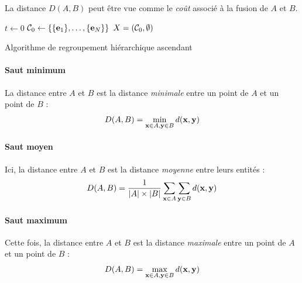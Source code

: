 La distance $D(A, B)$ peut être vue comme le \textit{coût} associé à la fusion de $A$ et $B$. 

\begin{algorithm}
$t \leftarrow  0$ \;
$\cal{C}_0 \leftarrow  \left\{ \{\bf{e}_1\}, \ldots, \{\bf{e}_N\} \right\}$\;
$X = (\cal{C}_0, \emptyset)$ \;

\caption{Algorithme de regroupement hiérarchique ascendant}
\end{algorithm}

\paragraph{Saut minimum}

La distance entre $A$ et $B$ est la distance \textit{minimale} entre un point de $A$ et un point de $B$ :
\begin{equation}
    D(A, B) = \min_{\bf{x} \in A, \bf{y} \in B} d(\bf{x}, \bf{y})
\end{equation}

\paragraph{Saut moyen}

Ici, la distance entre $A$ et $B$ est la distance \textit{moyenne} entre leurs entités :
\begin{equation}
    D(A, B) = \frac{1}{|A| \times |B|} \sum_{\bf{x} \in A} \sum_{\bf{y} \in B} d(\bf{x}, \bf{y})
\end{equation}

\paragraph{Saut maximum}

Cette fois, la distance entre $A$ et $B$ est la distance \textit{maximale} entre un point de $A$ et un point de $B$ :
\begin{equation}
    D(A, B) = \max_{\bf{x} \in A, \bf{y} \in B} d(\bf{x}, \bf{y})
\end{equation}

